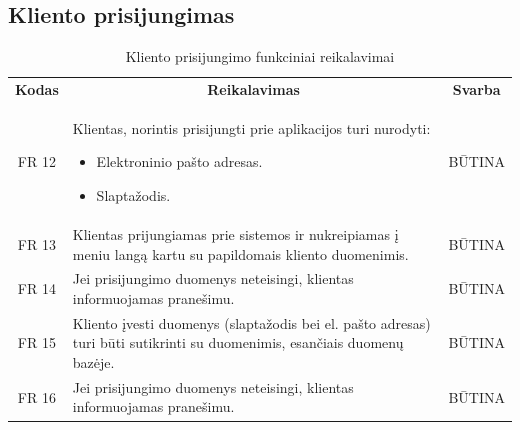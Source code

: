 \documentclass{VUMIFPSkursinis}
\begin{document}
{{{{{\subsection{Kliento prisijungimas}

\begin{center}
	\begin{table}[H]
	\caption{Kliento prisijungimo funkciniai reikalavimai}
	\begin{tabular}{|p{2cm}|p{}|p{}|}
	\hline
	    \rowcolor{lightgray}
		\multicolumn{3}{|c|}{Kliento prisijungimas}\\
		
	\hline
		\multicolumn{1}{|c|}{{\bfseries Kodas}}&
		\multicolumn{1}{|c|}{{\bfseries Reikalavimas}}&
		\multicolumn{1}{|c|}{{\bfseries Svarba}}\\

	\hline
	
		\multicolumn{1}{|c|}{FR 12}&
		{Klientas, norintis prisijungti prie aplikacijos turi nurodyti:
			\begin{itemize}
				\item Elektroninio pašto adresas.
				\item Slaptažodis.
			\end{itemize}
		}&
		\multicolumn{1}{|c|}{BŪTINA}\\	
		
	\hline	
		\multicolumn{1}{|c|}{FR 13}&
		{Klientas prijungiamas prie sistemos ir nukreipiamas į meniu langą kartu su papildomais kliento duomenimis.}&
		\multicolumn{1}{|c|}{BŪTINA}\\
		
	\hline	
		\multicolumn{1}{|c|}{FR 14}&
		{Jei prisijungimo duomenys neteisingi, klientas informuojamas pranešimu.}&
		\multicolumn{1}{|c|}{BŪTINA}\\		
		
	\hline
		\multicolumn{1}{|c|}{FR 15}&
		{Kliento įvesti duomenys (slaptažodis bei el. pašto adresas) turi būti sutikrinti su duomenimis, esančiais duomenų bazėje.}&
		\multicolumn{1}{|c|}{BŪTINA}\\
		
	\hline	
		\multicolumn{1}{|c|}{FR 16}&
		{Jei prisijungimo duomenys neteisingi, klientas informuojamas pranešimu.}&
		\multicolumn{1}{|c|}{BŪTINA}\\
	\hline
	
	
	
	\end{tabular}	
	
	\label{table:VartotojoPrisijungimas}		
	\end{table}


\end{center}}}}}}
\end{document}
